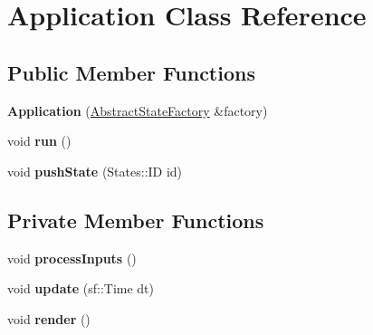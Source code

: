 \hypertarget{classApplication}{\section{\-Application \-Class \-Reference}
\label{classApplication}
}
\subsection*{\-Public \-Member \-Functions}
\begin{DoxyCompactItemize}
\item 
\hypertarget{classApplication_a328ef40e03ee2fe1d68dd34e2be5e80c_a328ef40e03ee2fe1d68dd34e2be5e80c}{{\bfseries \-Application} (\hyperlink{classAbstractStateFactory}{\-Abstract\-State\-Factory} \&factory)}\label{classApplication_a328ef40e03ee2fe1d68dd34e2be5e80c_a328ef40e03ee2fe1d68dd34e2be5e80c}

\item 
\hypertarget{classApplication_a68965449404743bf1add056784d6cf81_a68965449404743bf1add056784d6cf81}{void {\bfseries run} ()}\label{classApplication_a68965449404743bf1add056784d6cf81_a68965449404743bf1add056784d6cf81}

\item 
\hypertarget{classApplication_a0603f060b53ea465da8a80d625429d10_a0603f060b53ea465da8a80d625429d10}{void {\bfseries push\-State} (\-States\-::\-I\-D id)}\label{classApplication_a0603f060b53ea465da8a80d625429d10_a0603f060b53ea465da8a80d625429d10}

\end{DoxyCompactItemize}
\subsection*{\-Private \-Member \-Functions}
\begin{DoxyCompactItemize}
\item 
\hypertarget{classApplication_a157472e00e1db5fced576a262c866702_a157472e00e1db5fced576a262c866702}{void {\bfseries process\-Inputs} ()}\label{classApplication_a157472e00e1db5fced576a262c866702_a157472e00e1db5fced576a262c866702}

\item 
\hypertarget{classApplication_aa1493bab632d6909708b0dc214f464de_aa1493bab632d6909708b0dc214f464de}{void {\bfseries update} (sf\-::\-Time dt)}\label{classApplication_aa1493bab632d6909708b0dc214f464de_aa1493bab632d6909708b0dc214f464de}

\item 
\hypertarget{classApplication_a9ac99d97ee1cc814298a2f2388bde835_a9ac99d97ee1cc814298a2f2388bde835}{void {\bfseries render} ()}\label{classApplication_a9ac99d97ee1cc814298a2f2388bde835_a9ac99d97ee1cc814298a2f2388bde835}

\end{DoxyCompactItemize}
